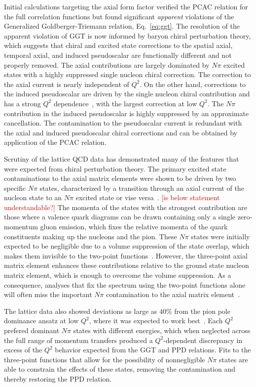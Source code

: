 Initial calculations targeting the axial form factor verified the PCAC relation
 for the full correlation functions but found significant \emph{apparent} violations
 of the Generalized Goldberger-Triemann relation, Eq.~\ref{eq:ggt}.
The resolution of the apparent violation of GGT
 is now informed by baryon chiral perturbation theory, which suggests that chiral
 and excited state corrections to the spatial axial, temporal axial, and induced pseudoscalar
 are functionally different and not properly removed.
The axial contributions are largely dominated by $N\pi$ excited states
 with a highly suppressed single nucleon chiral correction.
The correction to the axial current is nearly independent of $Q^2$.
On the other hand, corrections to the induced pseudoscalar are
 driven by the single nucleon chiral contribution and has
 a strong $Q^2$ dependence~\cite{Bar:2018xyi}, with the largest correction at low $Q^2$.
The $N\pi$ contribution in the induced pseudoscalar is highly suppressed by
 an approximate cancellation.
The contamination to the pseudoscalar current is redundant with the
 axial and induced pseudoscalar chiral corrections and can be obtained
 by application of the PCAC relation.

Scrutiny of the lattice QCD data has demonstrated many of the features
 that were expected from chiral perturbation theory.
The primary excited state contaminations to the axial matrix elements
 were shown to be driven by two specific $N\pi$ states,
 characterized by a transition through an axial current
 of the nucleon state to an $N\pi$ excited state or vise versa~\cite{Jang:2019vkm}.
\textcolor{red}{[is below statement understandable?]}
The momenta of the states with the strongest contribution are those
 where a valence quark diagrams can be drawn containing only a single
 zero-momentum gluon emission, which fixes the relative momenta of the
 quark constituents making up the nucleons and the pion.
These $N\pi$ states were initially expected to be negligible due to a volume suppression
 of the state overlap, which makes them invisible to the two-point functions~\cite{Bar:2016uoj}.
However, the three-point axial matrix element enhances these contributions relative
 to the ground state nucleon matrix element, which is enough to overcome the volume suppression.
As a consequence, analyses that fix the spectrum using the two-point functions alone
 will often miss the important $N\pi$ contamination to the
 axial matrix element~\cite{Jang:2019vkm,He:2021yvm}.

The lattice data also showed deviations as large as $40\%$ from the pion pole
 dominance ansatz at low $Q^2$, where it was expected to
 work best~\cite{Bali:2014nma,Gupta:2017dwj}.
Each $Q^2$ prefered dominant $N\pi$ states with different energies,
 which when neglected across the full range of momentum transfers
 produced a $Q^2$-dependent discrepancy in excess of the $Q^2$ behavior
 expected from the GGT and PPD relations.
Fits to the three-point functions that allow for the possibility of
 nonnegligible $N\pi$ states are able to constrain the effects of these states,
 removing the contamination and thereby restoring the PPD relation.

